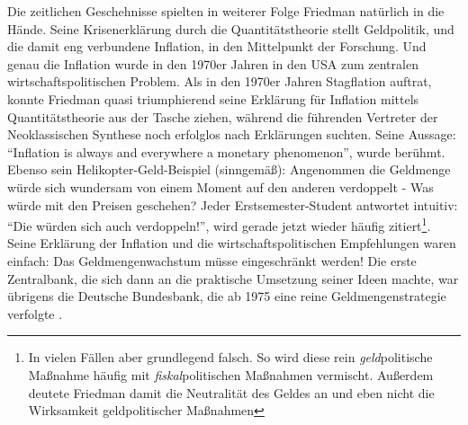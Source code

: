 Die zeitlichen Geschehnisse spielten in weiterer Folge Friedman natürlich in die Hände. Seine Krisenerklärung durch die Quantitätstheorie stellt Geldpolitik, und die damit eng verbundene Inflation, in den Mittelpunkt der Forschung. Und genau die Inflation wurde in den 1970er Jahren in den USA zum zentralen wirtschaftspolitischen Problem. Als in den 1970er Jahren Stagflation auftrat, konnte Friedman quasi triumphierend seine Erklärung für Inflation mittels Quantitätstheorie aus der Tasche ziehen, während die führenden Vertreter der Neoklassischen Synthese noch erfolglos nach Erklärungen suchten. Seine Aussage: "`Inflation is always and everywhere a monetary phenomenon"', wurde berühmt. Ebenso sein Helikopter-Geld-Beispiel \parencite{Friedman1969} (sinngemäß): Angenommen die Geldmenge würde sich wundersam von einem Moment auf den anderen verdoppelt - Was würde mit den Preisen geschehen? Jeder Erstsemester-Student antwortet intuitiv: "`Die würden sich auch verdoppeln!"', wird gerade jetzt wieder häufig zitiert\footnote{In vielen Fällen aber grundlegend falsch. So wird diese rein \textit{geld}politische Maßnahme häufig mit \textit{fiskal}politischen Maßnahmen vermischt. Außerdem deutete Friedman damit die Neutralität des Geldes an und eben nicht die Wirksamkeit geldpolitischer Maßnahmen}. Seine Erklärung der Inflation und die wirtschaftspolitischen Empfehlungen waren einfach: Das Geldmengenwachstum müsse eingeschränkt werden!   
Die erste Zentralbank, die sich dann an die praktische Umsetzung seiner Ideen machte, war übrigens die Deutsche Bundesbank, die ab 1975 eine reine Geldmengenstrategie verfolgte \parencite[S. 36]{BBK2016}. 
